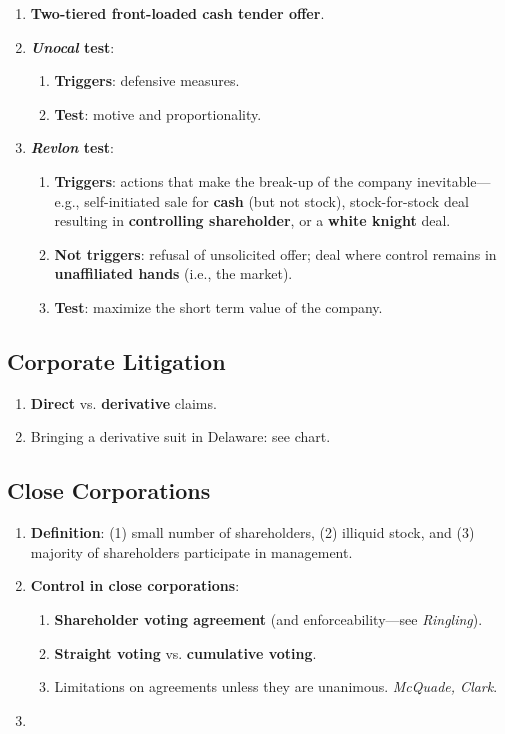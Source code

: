 \begin{enumerate}
    \item \textbf{Two-tiered front-loaded cash tender offer}.
    \item \textbf{\emph{Unocal} test}:
    \begin{enumerate}
        \item \textbf{Triggers}: defensive measures.
        \item \textbf{Test}: motive and proportionality.
    \end{enumerate}
    \item \textbf{\emph{Revlon} test}:
    \begin{enumerate}
        \item \textbf{Triggers}: actions that make the break-up of the company 
        inevitable---e.g., self-initiated sale for \textbf{cash} (but not 
        stock), stock-for-stock deal resulting in \textbf{controlling 
        shareholder}, or a \textbf{white knight} deal.
        \item \textbf{Not triggers}: refusal of unsolicited offer; deal where 
        control remains in \textbf{unaffiliated hands} (i.e., the market).
        \item \textbf{Test}: maximize the short term value of the company.
    \end{enumerate}
\end{enumerate}

\newpage

\subsection{Corporate Litigation}

\begin{enumerate}
    \item \textbf{Direct} vs. \textbf{derivative} claims.
    \item Bringing a derivative suit in Delaware: see chart.
\end{enumerate}

\newpage

\subsection{Close Corporations}

\begin{enumerate}
    \item \textbf{Definition}: (1) small number of shareholders, (2) illiquid 
    stock, and (3) majority of shareholders participate in management. 
    \item \textbf{Control in close corporations}:
    \begin{enumerate}
        \item \textbf{Shareholder voting agreement} (and enforceability---see 
        \emph{Ringling}).
        \item \textbf{Straight voting} vs. \textbf{cumulative voting}.
        \item Limitations on agreements unless they are unanimous. 
        \emph{McQuade, Clark}.
    \end{enumerate}
    \item 
\end{enumerate}
